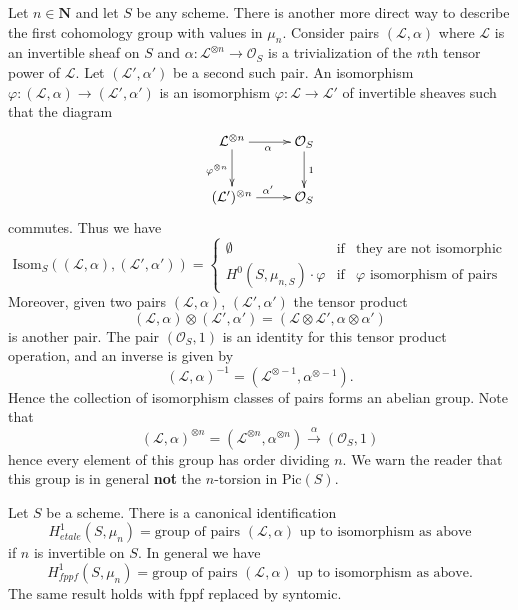 \medskip\noindent
Let $n \in \mathbf{N}$ and let $S$ be any scheme.
There is another more direct way to describe the first cohomology group with
values in $\mu_n$. Consider pairs
$(\mathcal{L}, \alpha)$ where $\mathcal{L}$ is an invertible sheaf on $S$
and $\alpha : \mathcal{L}^{\otimes n} \to \mathcal{O}_S$ is a trivialization
of the $n$th tensor power of $\mathcal{L}$.
Let $(\mathcal{L}', \alpha')$ be a second such pair.
An isomorphism $\varphi : (\mathcal{L}, \alpha) \to (\mathcal{L}', \alpha')$
is an isomorphism $\varphi : \mathcal{L} \to \mathcal{L}'$ of invertible
sheaves such that the diagram
$$
\xymatrix{
\mathcal{L}^{\otimes n} \ar[d]_{\varphi^{\otimes n}} \ar[r]_\alpha &
\mathcal{O}_S \ar[d]^1 \\
(\mathcal{L}')^{\otimes n} \ar[r]^{\alpha'} &
\mathcal{O}_S \\
}
$$
commutes. Thus we have
\begin{equation}
\label{equation-isomorphisms-pairs}
\text{Isom}_S((\mathcal{L}, \alpha), (\mathcal{L}', \alpha'))
=
\left\{
\begin{matrix}
\emptyset & \text{if} & \text{they are not isomorphic} \\
H^0(S, \mu_{n, S})\cdot \varphi & \text{if} &
\varphi \text{ isomorphism of pairs}
\end{matrix}
\right.
\end{equation}
Moreover, given two pairs $(\mathcal{L}, \alpha)$, $(\mathcal{L}', \alpha')$
the tensor product
$$
(\mathcal{L}, \alpha) \otimes (\mathcal{L}', \alpha')
=
(\mathcal{L} \otimes \mathcal{L}', \alpha \otimes \alpha')
$$
is another pair. The pair $(\mathcal{O}_S, 1)$ is an identity for this
tensor product operation, and an inverse is given by
$$
(\mathcal{L}, \alpha)^{-1} = (\mathcal{L}^{\otimes -1}, \alpha^{\otimes -1}).
$$
Hence the collection of isomorphism classes of pairs forms an abelian group.
Note that
$$
(\mathcal{L}, \alpha)^{\otimes n}
=
(\mathcal{L}^{\otimes n}, \alpha^{\otimes n})
\xrightarrow{\alpha}
(\mathcal{O}_S, 1)
$$
hence every element of this group has order dividing $n$. We warn the reader
that this group is in general {\bf not} the $n$-torsion in $\text{Pic}(S)$.

\begin{lemma}
\label{lemma-describe-h1-mun}
Let $S$ be a scheme. There is a canonical identification
$$
H_{etale}^1(S, \mu_n) =
\text{group of pairs }(\mathcal{L}, \alpha)\text{ up to isomorphism as above}
$$
if $n$ is invertible on $S$. In general we have
$$
H_{fppf}^1(S, \mu_n) =
\text{group of pairs }(\mathcal{L}, \alpha)\text{ up to isomorphism as above}.
$$
The same result holds with fppf replaced by syntomic.
\end{lemma}

